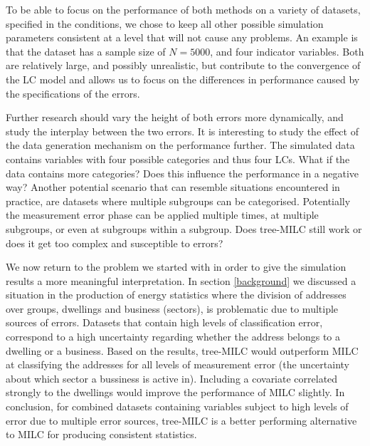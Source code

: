 \documentclass[a4paper, 11pt]{article} %
\begin{document}

To be able to focus on the performance of both methods on a variety of datasets, specified in the conditions, we chose to keep all other possible simulation parameters consistent at a level that will not cause any problems. An example is that the dataset has a sample size of $N=5000$, and four indicator variables. Both are relatively large, and possibly unrealistic, but contribute to the convergence of the LC model and allows us to focus on the differences in performance caused by the specifications of the errors. 

Further research should vary the height of both errors more dynamically, and study the interplay between the two errors. It is interesting to study the effect of the data generation mechanism on the performance further. The simulated data contains variables with four possible categories and thus four LCs. What if the data contains more categories? Does this influence the performance in a negative way? Another potential scenario that can resemble situations encountered in practice, are datasets where multiple subgroups can be categorised. Potentially the measurement error phase can be applied multiple times, at multiple subgroups, or even at subgroups within a subgroup. Does tree-MILC still work or does it get too complex and susceptible to errors? 

We now return to the problem we started with in order to give the simulation results a more meaningful interpretation. In section \ref{background} we discussed a situation in the production of energy statistics where the division of addresses over groups, dwellings and business (sectors), is problematic due to multiple sources of errors. 
Datasets that contain high levels of classification error, correspond to a high uncertainty regarding whether the address belongs to a dwelling or a business. Based on the results, tree-MILC would outperform MILC at classifying the addresses for all levels of measurement error (the uncertainty about which sector a bussiness is active in). Including a covariate correlated strongly to the dwellings would improve the performance of MILC slightly. In conclusion, for combined datasets containing variables subject to high levels of error due to multiple error sources, tree-MILC is a better performing alternative to MILC for producing consistent statistics.  
\end{document}

